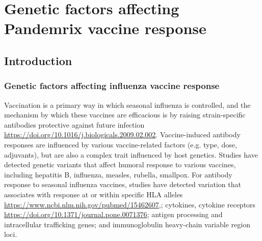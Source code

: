 %
%

\chapter{Genetic factors affecting Pandemrix vaccine response}
\label{chap:hird_reQTL}

\section{Introduction}

\subsection{Genetic factors affecting influenza vaccine response}

Vaccination is a primary way in which seasonal influenza is controlled,
and the mechanism by which these vaccines are efficacious is by raising strain-specific antibodies protective against future infection \url{https://doi.org/10.1016/j.biologicals.2009.02.002}.
Vaccine-induced antibody responses are influenced by various vaccine-related factors (e.g. type, dose, adjuvants), but are also a complex trait influenced by host genetics\autocite{linnik2016ImpactHostGenetic, mentzer2015SearchingHumanGenetic}.
Studies have detected genetic variants that affect humoral response to various vaccines, including hepatitis B, influenza, measles, rubella, smallpox\autocite{linnik2016ImpactHostGenetic,dhakal2019HostFactorsImpact}.
For antibody response to seasonal influenza vaccines, studies have detected variation that associates with response at or within
specific \gls{HLA} alleles \url{https://www.ncbi.nlm.nih.gov/pubmed/15462607},\autocite{poland2008ImmunogeneticsSeasonalInfluenza};
cytokines, cytokine receptors\autocite{poland2008ImmunogeneticsSeasonalInfluenza} \url{https://doi.org/10.1371/journal.pone.0071376};
antigen processing and intracellular trafficking genes\autocite{franco2013IntegrativeGenomicAnalysis}; 
and immunoglobulin heavy-chain variable region loci.

